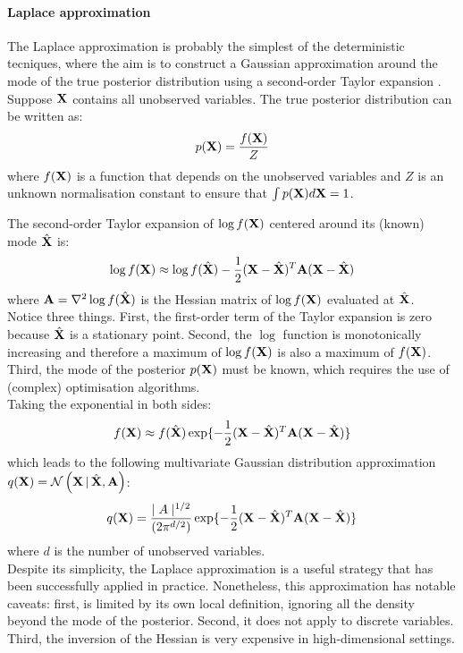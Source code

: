 \paragraph{Laplace approximation}%
The Laplace approximation is probably the simplest of the deterministic tecniques, where the aim is to construct a Gaussian approximation around the mode of the true posterior distribution using a second-order Taylor expansion \cite{Bishop2006,Murphy}.\\
Suppose ${\bf X}$ contains all unobserved variables. The true posterior distribution can be written as:
\[
p({\bf X}) = \frac{f({\bf X})}{Z}
\]
where $f({\bf X})$ is a function that depends on the unobserved variables and $Z$ is an unknown normalisation constant to ensure that $\int p({\bf X}) d{\bf X} = 1$.

The second-order Taylor expansion of $\log f({\bf X})$ centered around its (known) mode $\hat{{\bf X}}$ is: 
\[
	\log f({\bf X}) \approx \log f(\hat{{\bf X}}) - \frac{1}{2} ({\bf X}-\hat{{\bf X}})^T {\bf A} ({\bf X}-\hat{{\bf X}})
\]
where ${\bf A} = \nabla^2 \log f(\hat{{\bf X}})$ is the Hessian matrix of $\log f({\bf X})$ evaluated at $\hat{{\bf X}}$.\\
Notice three things. First, the first-order term of the Taylor expansion is zero because $\hat{{\bf X}}$ is a stationary point. Second, the $\log$ function is monotonically increasing and therefore a maximum of $\log f({\bf X})$ is also a maximum of $f({\bf X})$. Third, the mode of the posterior $p({\bf X})$ must be known, which requires the use of (complex) optimisation algorithms.\\
Taking the exponential in both sides:
\[
	f({\bf X}) \approx f(\hat{{\bf X}}) \exp\{ -\frac{1}{2} ({\bf X}-\hat{{\bf X}})^T {\bf A} ({\bf X}-\hat{{\bf X}}) \}
\]
which leads to the following multivariate Gaussian distribution approximation $q({\bf X}) = \mathcal{N}\left({\bf X} \,|\, \hat{{\bf X}},{\bf A}\right)$:
\[
	q({\bf X}) = \frac{\mid A \mid^{1/2}}{(2\pi^{d/2})} \exp\{ -\frac{1}{2} ({\bf X}-\hat{{\bf X}})^T {\bf A} ({\bf X}-\hat{{\bf X}}) \}
\]
where $d$ is the number of unobserved variables. \\
Despite its simplicity, the Laplace approximation is a useful strategy that has been successfully applied in practice. Nonetheless, this approximation has notable caveats: first, is limited by its own local definition, ignoring all the density beyond the mode of the posterior. Second, it does not apply to discrete variables. Third, the inversion of the Hessian is very expensive in high-dimensional settings.

